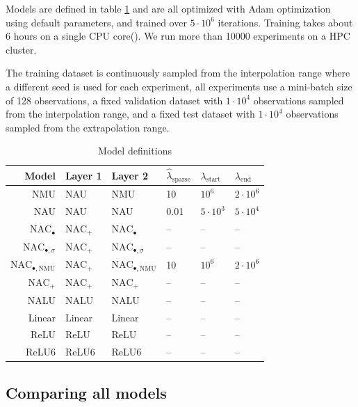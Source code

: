 Models are defined in table \ref{tab:simple-function-task-model-defintions} and are all optimized with Adam optimization \cite{adam-optimization} using default parameters, and trained over $5 \cdot 10^6$ iterations. Training takes about 6 hours on a single CPU core(). We run more than 10000 experiments on a HPC cluster.

The training dataset is continuously sampled from the interpolation range where a different seed is used for each experiment, all experiments use a mini-batch size of 128 observations, a fixed validation dataset with $1 \cdot 10^4$ observations sampled from the interpolation range, and a fixed test dataset with $1 \cdot 10^4$ observations sampled from the extrapolation range.

\begin{table}[h]
\caption{Model definitions}
\label{tab:simple-function-task-model-defintions}
\centering
\begin{tabular}{r l l l l l}
\toprule
 Model & Layer 1 & Layer 2 & $\hat{\lambda}_{\mathrm{sparse}}$ & $\lambda_{\mathrm{start}}$ & $\lambda_{\mathrm{end}}$ \\
 \midrule
 NMU & NAU & NMU & 10 & $10^6$ & $2 \cdot 10^6$ \\
 NAU & NAU & NAU & 0.01 & $5 \cdot 10^3$ & $5 \cdot 10^4$ \\
 $\mathrm{NAC}_{\bullet}$ & $\mathrm{NAC}_{+}$ & $\mathrm{NAC}_{\bullet}$ & -- & -- & -- \\
 $\mathrm{NAC}_{\bullet,\sigma}$ & $\mathrm{NAC}_{+}$ & $\mathrm{NAC}_{\bullet,\sigma}$ & -- & -- & -- \\
 $\mathrm{NAC}_{\bullet,\mathrm{NMU}}$ & $\mathrm{NAC}_{+}$ & $\mathrm{NAC}_{\bullet,\mathrm{NMU}}$ & 10 & $10^6$ & $2 \cdot 10^6$ \\
 $\mathrm{NAC}_{+}$ & $\mathrm{NAC}_{+}$ & $\mathrm{NAC}_{+}$ & -- & -- & -- \\
 NALU & NALU & NALU & -- & -- & -- \\
 Linear & Linear & Linear & -- & -- & -- \\
 ReLU & ReLU & ReLU & -- & -- & -- \\
 ReLU6 & ReLU6 & ReLU6 & -- & -- & -- \\
 \bottomrule
\end{tabular}
\end{table}

\subsection{Comparing all models}
\label{sec:appendix:comparison-all-models}

